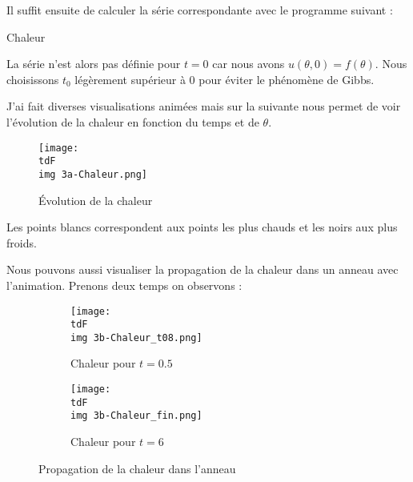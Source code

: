 		Il suffit ensuite de calculer la série correspondante avec le programme suivant :

		\begin{listing}[H]
			\caption{Chaleur}
			\label{code-6-chaleur}
		\end{listing}

		La série n'est alors pas définie pour $t=0$ car nous avons $u(\theta, 0) = f(\theta)$. Nous choisissons $t_0$ légèrement supérieur à 0 pour éviter le phénomène de Gibbs.


		J'ai fait diverses visualisations animées mais sur la suivante nous permet de voir l'évolution de la chaleur en fonction du temps et de $\theta$.

		\begin{figure}[H]
			\centering
			\texttt{[image: \\tdF\\img 3a-Chaleur.png]}
			\caption{Évolution de la chaleur}
			\label{img-6-Chaleur}
		\end{figure}

		Les points blancs correspondent aux points les plus chauds et les noirs aux plus froids.

		Nous pouvons aussi visualiser la propagation de la chaleur dans un anneau avec l'animation. Prenons deux temps on observons :
		\begin{figure}[H]
			\centering
			\begin{subfigure}{.45\linewidth}
				\centering
				\texttt{[image: \\tdF\\img 3b-Chaleur\_t08.png]}
				\caption{Chaleur pour $t=0.5$}
			\end{subfigure}
			\begin{subfigure}{.45\linewidth}
				\centering
				\texttt{[image: \\tdF\\img 3b-Chaleur\_fin.png]}
				\caption{Chaleur pour $t=6$}
			\end{subfigure}
			\caption{Propagation de la chaleur dans l'anneau}
			\label{img-6-anneauChaleur}
		\end{figure}







% 

